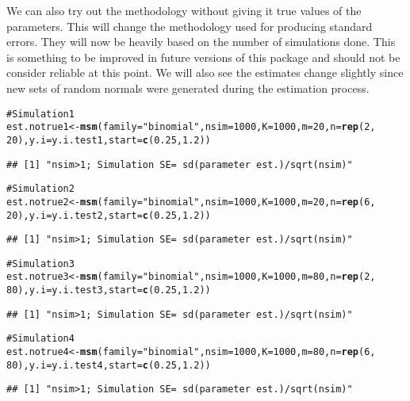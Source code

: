 \documentclass{article}\usepackage{graphicx, color}
\makeatletter
\newcommand{\hlfunctioncall}[1]{\textcolor[rgb]{0.501960784313725,0,0.329411764705882}{\textbf{#1}}}%
\newcommand{\hlstring}[1]{\textcolor[rgb]{0.6,0.6,1}{#1}}%
\newcommand{\hlcomment}[1]{\textcolor[rgb]{0.180392156862745,0.6,0.341176470588235}{#1}}%
\newenvironment{kframe}{%
 \def\at@end@of@kframe{}%
 \ifinner\ifhmode%
  \def\at@end@of@kframe{\end{minipage}}%
  \begin{minipage}{\columnwidth}%
 \fi\fi%
 \def\FrameCommand##1{\hskip\@totalleftmargin \hskip-\fboxsep
 \colorbox{shadecolor}{##1}\hskip-\fboxsep
     \hskip-\linewidth \hskip-\@totalleftmargin \hskip\columnwidth}%
 \MakeFramed {\advance\hsize-\width
   \@totalleftmargin\z@ \linewidth\hsize
   \@setminipage}}%
 {\par\unskip\endMakeFramed%
 \at@end@of@kframe}
\newenvironment{knitrout}{}{} %
\makeatother
\begin{document}
We can also try out the methodology without giving it true values of the parameters.  This will change the methodology used for producing standard errors.  They will now be heavily based on the number of simulations done.  This is something to be improved in future versions of this package and should not be consider reliable at this point.  We will also see the estimates change slightly since new sets of random normals were generated during the estimation process.
\begin{knitrout}\footnotesize
{}\color{fgcolor}\begin{kframe}
\begin{alltt}
\hlcomment{# Simulation 1}
est.notrue1 <- \hlfunctioncall{msm}(family = \hlstring{"binomial"}, nsim = 1000, K = 1000, m = 20, n = \hlfunctioncall{rep}(2, 
    20), y.i = y.i.test1, start = \hlfunctioncall{c}(0.25, 1.2))
\end{alltt}
\begin{verbatim}
## [1] "nsim>1; Simulation SE= sd(parameter est.)/sqrt(nsim)"
\end{verbatim}
\begin{alltt}

\hlcomment{# Simulation 2}
est.notrue2 <- \hlfunctioncall{msm}(family = \hlstring{"binomial"}, nsim = 1000, K = 1000, m = 20, n = \hlfunctioncall{rep}(6, 
    20), y.i = y.i.test2, start = \hlfunctioncall{c}(0.25, 1.2))
\end{alltt}
\begin{verbatim}
## [1] "nsim>1; Simulation SE= sd(parameter est.)/sqrt(nsim)"
\end{verbatim}
\begin{alltt}

\hlcomment{# Simulation 3}
est.notrue3 <- \hlfunctioncall{msm}(family = \hlstring{"binomial"}, nsim = 1000, K = 1000, m = 80, n = \hlfunctioncall{rep}(2, 
    80), y.i = y.i.test3, start = \hlfunctioncall{c}(0.25, 1.2))
\end{alltt}
\begin{verbatim}
## [1] "nsim>1; Simulation SE= sd(parameter est.)/sqrt(nsim)"
\end{verbatim}
\begin{alltt}

\hlcomment{# Simulation 4}
est.notrue4 <- \hlfunctioncall{msm}(family = \hlstring{"binomial"}, nsim = 1000, K = 1000, m = 80, n = \hlfunctioncall{rep}(6, 
    80), y.i = y.i.test4, start = \hlfunctioncall{c}(0.25, 1.2))
\end{alltt}
\begin{verbatim}
## [1] "nsim>1; Simulation SE= sd(parameter est.)/sqrt(nsim)"
\end{verbatim}
\begin{alltt}


\end{alltt}
\end{kframe}
\end{knitrout}
\end{document}
